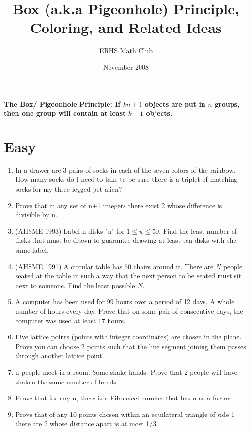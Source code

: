 \documentclass{article}
\title{Box (a.k.a Pigeonhole) Principle, Coloring, and Related Ideas}
\author{ERHS Math Club}
\date{November 2008}
\begin{document}
\maketitle{}

\textbf{The Box/ Pigeonhole Principle: If $kn+1$ objects are put in $n$ groups, then one group will contain at least $k+1$ objects.}

\section{Easy}
\begin{enumerate}
\item In a drawer are 3 pairs of socks in each of the seven colors of the rainbow. How many socks do I need to take to be sure there is a triplet of matching socks for my three-legged pet alien?
\item Prove that in any set of n+1 integers there exist 2 whose difference is divisible by n.
\item (AHSME 1993) Label n disks "n" for $1 \leq n \leq 50$. Find the least number of disks that must be drawn to guarantee drawing at least ten disks with the same label.
\item (AHSME 1991) A circular table has 60 chairs around it. There are $N$ people seated at the table in such a way that the next person to be seated must sit next to someone. Find the least possible $N$.
\item A computer has been used for 99 hours over a period of 12 days, A whole number of hours every day. Prove that on some pair of consecutive days, the computer was used at least 17 hours.
\item Five lattice points (points with integer coordinates) are chosen in the plane. Prove you can choose 2 points such that the line segment joining them passes through another lattice point.
\item n people meet in a room. Some shake hands. Prove that 2 people will have shaken the same number of hands.
\item Prove that for any n, there is a Fibonacci number that has n as a factor.
\item Prove that of any 10 points chosen within an equilateral triangle of side 1 there are 2 whose distance apart is at most 1/3.
\end{enumerate}
\end{document}
